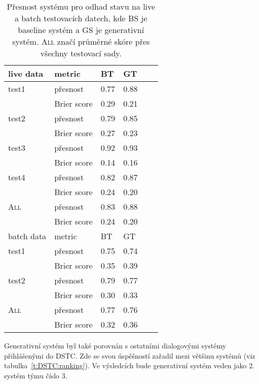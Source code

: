 \begin{table}[htb]
\begin{center}
\begin{tabular}{|l|l|l|l|l|l|}
  \hline
live data & metric      & BT & GT \\
\hline
test1 & přesnost    & 0.77 & 0.88 \\
        & Brier score & 0.29 & 0.21 \\
\hline
test2 & přesnost    & 0.79 & 0.85 \\
        & Brier score & 0.27 & 0.23 \\
\hline
test3  & přesnost    & 0.92 & 0.93 \\
        & Brier score & 0.14 & 0.16 \\
\hline
test4  & přesnost    & 0.82 & 0.87 \\
        & Brier score & 0.24 & 0.20 \\
\hline
\textsc{All}    & přesnost    & 0.83 & 0.88 \\
        & Brier score & 0.24 & 0.20 \\
\hline
\hline
batch data & metric      & BT & GT \\
\hline
test1 & přesnost    & 0.75 & 0.74 \\
        & Brier score & 0.35 & 0.39 \\
\hline
test2 & přesnost    & 0.79 & 0.77 \\
        & Brier score & 0.30 & 0.33 \\
\hline
\textsc{All}    & přesnost    & 0.77 & 0.76 \\
        & Brier score & 0.32 & 0.36 \\
\hline
\end{tabular}
\end{center}
\caption{Přesnost systému pro odhad stavu na live a batch testovacích datech, kde BS je baseline systém a GS je generativní systém. \textsc{All} značí průměrné skóre přes všechny testovací sady.}
\label{t:all:datasets}
\end{table}

Generativní systém byl také porovnán s ostatními dialogovými systémy přihlášenými do DSTC.
Zde se svou úspěšností zařadil mezi většinu systémů (viz tabulka~\ref{t:DSTC:ranking}).
Ve výsledcích bude generativní systém veden jako 2. systém týmu číslo 3.

